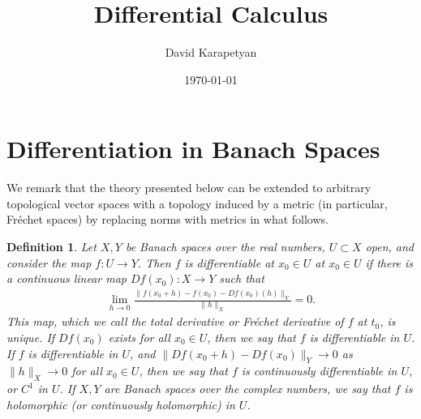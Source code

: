 \documentclass[12pt,reqno]{amsart}
\numberwithin{equation}{section}  %
\newtheorem{definition}[theorem]{Definition}
\begin{document}
\title{Differential Calculus}
\author{David Karapetyan}
\address{Department of Mathematics  \
    University  of Notre Dame\
        Notre Dame, IN 46556 }
        \date{\today}
        \maketitle
\section{Differentiation in Banach Spaces}
We remark that the theory presented below can be extended to arbitrary
topological vector spaces with a topology induced by a metric (in particular,
Fr\'echet spaces) by replacing norms with metrics in what follows.
\begin{definition}
	\label{def:diff}
	Let $X,Y$ be Banach spaces over the real numbers, $U \subset X$ open,
  and consider the map $f: U \to Y$.
  Then $f$ is differentiable at $x_0 \in U$ at $x_{0} \in U$ if there
	is a continuous linear map $Df(x_0): X \to Y$ such that
	\begin{equation}
		\label{diff-limit}
		\begin{split}
			\lim_{h \to 0} \frac{\|f(x_0+ h) - f(x_0) -
			Df(x_0)(h) \|_Y}{\|h\|_{X}} = 0.
		\end{split}
	\end{equation}
    This map, which we call the \emph{total derivative} or \emph{Fr\'echet derivative} of $f$ at $t_0$, is 
	unique. If $Df(x_0)$ exists for all $x_0 \in U$,
	then we say that $f$ is
    \emph{differentiable} in $U$. If $f$ is differentiable in $U$, and 
	$\|Df(x_0 + h) - Df(x_0) \|_Y \to 0$ as $\|h\|_{X} \to 0$ for all $x_0 \in U$,
    then we say that $f$ is \emph{continuously differentiable in $U$}, or $C^{1}$ in $U$. If $X, Y$
  are Banach spaces over the complex numbers, we say that $f$ is
  \emph{holomorphic} (or \emph{continuously holomorphic}) in $U$.
\end{definition}
\end{document}
